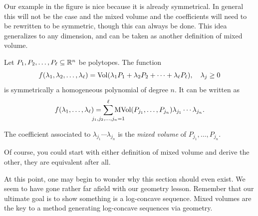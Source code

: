 \documentclass[12pt,oneside]{../../sfsuthesis}
\begin{document}
Our example in the figure is nice because it is already symmetrical.
In general this will not be the case and the mixed volume and the coefficients will need to be rewritten to be symmetric, though this can always be done.
This idea generalizes to any dimension, and can be taken as another definition of mixed volume.
\begin{definition}
    Let  \( P_1, P_2, \dots, P_\ell \subseteq \mathbb{R}^n \) be polytopes.
    The function
    \[
        f(\lambda_1, \lambda_2, \dots, \lambda_\ell)  = \operatorname{Vol}(\lambda_1 P_1 + \lambda_2 P_2 + \cdots + \lambda_\ell P_\ell), \quad \lambda_j \geq 0
    \]
    is symmetrically a homogeneous polynomial of degree \( n \).
    It can be written as
    \[
        f(\lambda_1, \dots, \lambda_\ell) = \sum_{\mathclap{j_1, j_2, \dots, j_n = 1}}^{\ell} \MVol(P_{j_1}, \dots, P_{j_n})\lambda_{j_1} \cdots \lambda_{j_n}.
    \]

    The coefficient associated to \( \lambda_{j_1} \cdots \lambda_{j_n} \) is the \emph{mixed volume} of \( P_{j_1}, \dots, P_{j_n} \).

\end{definition}
Of course, you could start with either definition of mixed volume and derive the other, they are equivalent after all.

At this point, one may begin to wonder why this section should even exist.
We seem to have gone rather far afield with our geometry lesson.
Remember that our ultimate goal is to show something is a log-concave sequence.
Mixed volumes are the key to a method generating log-concave sequences via geometry.
\end{document}
